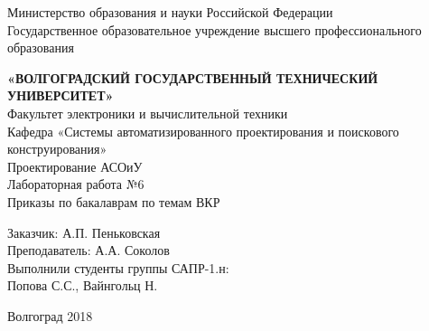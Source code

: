\documentclass[utf8x]{article}
\begin{document}
\date{}
\begin{center}
\hfill \break
\large{Министерство образования и науки Российской Федерации}\\

\large{Государственное образовательное учреждение высшего профессионального образования}\\
\hfill \break

\large{\textbf{«ВОЛГОГРАДСКИЙ ГОСУДАРСТВЕННЫЙ ТЕХНИЧЕСКИЙ УНИВЕРСИТЕТ»}}\\
\hfill \break
\normalsize{Факультет электроники и вычислительной техники}\\
 \hfill \break
\normalsize{Кафедра «Системы автоматизированного проектирования и поискового конструирования»}\\
\hfill\break
\hfill \break
\hfill \break
\hfill \break
\large{Проектирование АСОиУ}\\
\hfill \break
\hfill \break
\hfill \break
\normalsize{Лабораторная работа №6}\\
\hfill \break
Приказы по бакалаврам по темам ВКР\\
\hfill \break

\hfill \break
\hfill \break
\end{center}
 
\hfill \break
\hfill \break
\hfill \break
\hfill \break
\hfill \break
\hfill \break
\begin{flushright}
\normalsize{ 

Заказчик:  А.П. Пеньковская 
\\
\hfill \break
Преподаватель: А.А. Соколов 
\\
\hfill \break
Выполнили студенты группы САПР-1.н:
\\

Попова С.С., Вайнгольц Н. 


}
\end{flushright}


\hfill \break
\hfill \break
\hfill \break
\hfill \break
\hfill \break
\hfill \break
\hfill \break
\hfill \break
\hfill \break
\hfill \break


\begin{center} Волгоград 2018 \end{center}
\thispagestyle{empty} 
 
\renewcommand{\contentsname}{Содержание}\tableofcontents

\newpage
\end{document}
